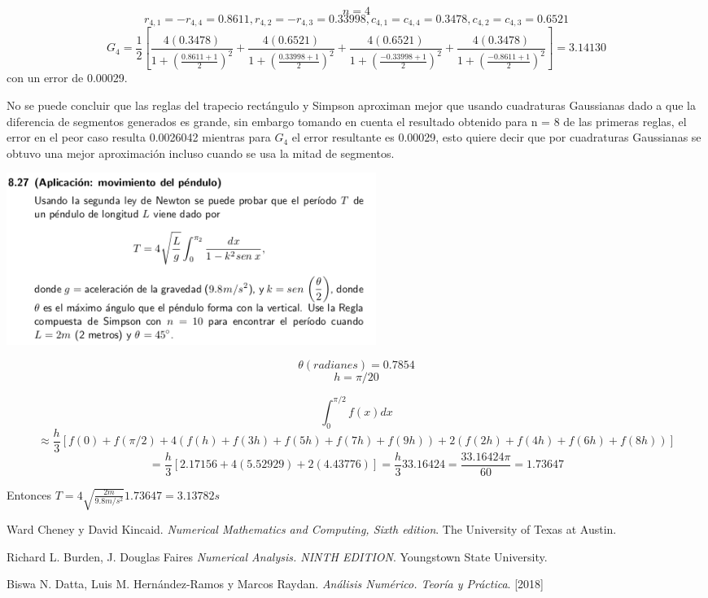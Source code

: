 \documentclass[11pt]{article}
\begin{document}
$$n = 4$$
$$r_{4,1} = -r_{4,4} = 0.8611, r_{4,2} = -r_{4,3} = 0.33998, c_{4,1} = c_{4,4}= 0.3478, c_{4,2} = c_{4,3} = 0.6521$$ 
$$
G_4 = \frac{1}{2} [ \frac{4(0.3478)}{1+(\frac{0.8611+1}{2})^2} + \frac{4(0.6521)}{1+(\frac{0.33998+1}{2})^2} + 
\frac{4(0.6521)}{1+(\frac{-0.33998+1}{2})^2} + \frac{4(0.3478)}{1+(\frac{-0.8611+1}{2})^2} ] = 3.14130
$$
con un error de 0.00029.

No se puede concluir que las reglas del trapecio rectángulo y Simpson aproximan mejor que usando cuadraturas Gaussianas dado a que la diferencia de segmentos generados es grande, sin embargo tomando en cuenta el resultado obtenido para n = 8 de las primeras reglas, el error en el peor caso resulta 0.0026042 mientras para $G_4$ el error resultante es 0.00029, esto quiere decir que por cuadraturas Gaussianas se obtuvo una mejor aproximación incluso cuando se usa la mitad de segmentos.

\vspace{0.5cm}
\begin{center}
    \includegraphics[keepaspectratio, width=12cm]{8.27.png}
    \caption{\\}
\end{center} 

$$\theta(radianes) = 0.7854$$
$$h = \pi/20$$

$$\int_{0}^{\pi/2} f(x)dx$$
$$\approx \frac{h}{3} [
f(0)+f(\pi/2)+4(f(h)+f(3h)+f(5h)+f(7h)+f(9h))+2(f(2h)+f(4h)+f(6h)+f(8h))]$$ 
$$= \frac{h}{3} [
2.17156+4(5.52929)+2(4.43776)] = \frac{h}{3}33.16424 = \frac{33.16424\pi}{60} = 1.73647
$$

Entonces $T = 4 \sqrt{\frac{2m}{9.8m/s^2}} 1.73647 = 3.13782s$


\vspace{1cm}	
\begin{thebibliography}{9}

Ward Cheney y David Kincaid.
\textit{Numerical Mathematics and Computing, Sixth edition}.
The University of Texas at Austin.


Richard L. Burden, J. Douglas Faires 
\textit{Numerical Analysis. NINTH EDITION}. 
Youngstown State University.

Biswa N. Datta, Luis M. Hernández-Ramos y Marcos Raydan.
\textit{Análisis Numérico. Teoría y Práctica}. 
[2018]

\end{thebibliography}
\end{document}
